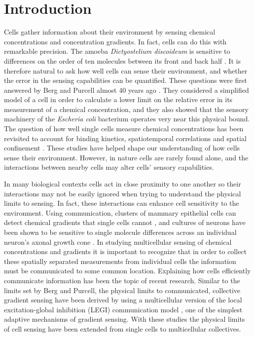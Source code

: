 %
%
%


\chapter{Introduction}

Cells gather information about their environment by sensing chemical concentrations and concentration gradients. In fact, cells can do this with remarkable precision. The amoeba \textit{Dictyostelium discoideum} is sensitive to differences on the order of ten molecules between its front and back half \cite{song2006dictyostelium}. It is therefore natural to ask how well cells can sense their environment, and whether the error in the sensing capabilities can be quantified. These questions were first answered by Berg and Purcell almost 40 years ago \cite{berg1977physics}. They considered a simplified model of a cell in order to calculate a lower limit on the relative error in its measurement of a chemical concentration, and they also showed that the sensory machinery of the \textit{Escheria coli} bacterium operates very near this physical bound. The question of how well single cells measure chemical concentrations has been revisited to account for binding kinetics, spatiotemporal correlations and spatial confinement \cite{bialek2005physical, kaizu2014berg, bicknell2015limits}. These studies have helped shape our understanding of how cells sense their environment. However, in nature cells are rarely found alone, and the interactions between nearby cells may alter cells' sensory capabilities.

In many biological contexts cells act in close proximity to one another so their interactions may not be easily ignored when trying to understand the physical limits to sensing. In fact, these interactions can enhance cell sensitivity to the environment. Using communication, clusters of mammary epithelial cells can detect chemical gradients that single cells cannot \cite{ellison2015cell}, and cultures of neurons have been shown to be sensitive to single molecule differences across an individual neuron's axonal growth cone \cite{rosoff2004new}. In studying multicellular sensing of chemical concentrations and gradients it is important to recognize that in order to collect these spatially separated measurements from individual cells the information must be communicated to some common location. Explaining how cells efficiently communicate information has been the topic of recent research. Similar to the limits set by Berg and Purcell, the physical limits to communicated, collective gradient sensing have been derived \cite{mugler2015limits,ellison2015cell} by using a multicellular version of the local excitation-global inhibition (LEGI) communication model \cite{levchenko2002models}, one of the simplest adaptive mechanisms of gradient sensing. With these studies the physical limits of cell sensing have been extended from single cells to multicellular collectives.

